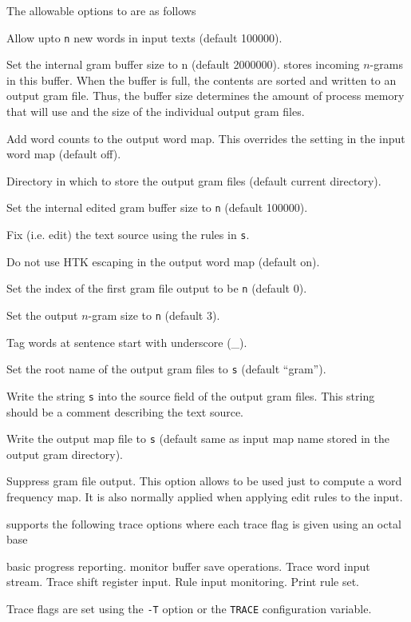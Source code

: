 The allowable options to  are as follows

\begin{optlist}
   Allow upto \texttt{n} new words in input texts
  (default 100000).

   Set the internal gram buffer size to n (default
  2000000).  stores incoming $n$-grams in this buffer.
  When the buffer is full, the contents are sorted and written to an
  output gram file.  Thus, the buffer size determines the amount of
  process memory that  will use and the size of the
  individual output gram files.

   Add word counts to the output word map.  This overrides
       the setting in the input word map (default off).

   Directory in which to store the output gram files
             (default current directory).
        
   Set the internal edited gram buffer size to \texttt{n}
  (default 100000).

   Fix (i.e. edit) the text source using the rules in
	\texttt{s}.

   Do not use HTK escaping in the output word map (default
              on).

   Set the index of the first gram file output 
             to be \texttt{n} (default 0).

   Set the output $n$-gram size to \texttt{n} (default 3).

   Tag words at sentence start with underscore (\_).

   Set the root name of the output gram files to
       \texttt{s} (default ``gram'').

   Write the string \texttt{s} into the source field of
       the output gram files.  This string should be a comment
       describing the text source.

   Write the output map file to \texttt{s} (default same
      as input map name stored in the output gram directory).

   Suppress gram file output. This option allows
       to be used just to compute a word frequency map.
      It is also normally applied when applying edit rules to the
      input.

  \stdoptQ
\end{optlist}


 supports the following trace options where each
trace flag is given using an octal base
\begin{optlist}
  basic progress reporting. 
  monitor buffer save operations.
  Trace word input stream.
  Trace shift register input.
  Rule input monitoring.
  Print rule set.
\end{optlist}
Trace flags are set using the \texttt{-T} option or the \texttt{TRACE}
configuration variable.

